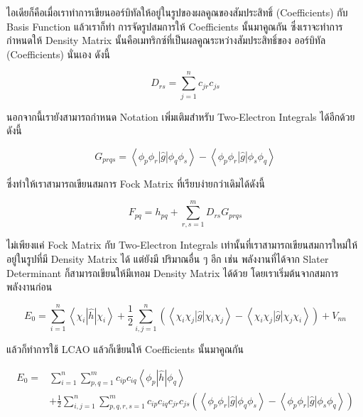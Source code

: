 \noindent ไอเดียก็คือเมื่อเราทำการเขียนออร์บิทัลให้อยู่ในรูปของผลคูณของสัมประสิทธิ์ (Coefficients) กับ Basis Function แล้วเราก็ทำ%
การจัดรูปสมการให้ Coefficients นั้นมาคูณกัน ซึ่งเราจะทำการกำหนดให้ Density Matrix นั้นคือเมทริกซ์ที่เป็นผลคูณระหว่างสัมประสิทธิ์ของ%
ออร์บิทัล (Coefficients) นั่นเอง ดังนี้

\begin{equation}
  \label{eq:Density Matrix}
  D_{r s} = \sum_{j=1}^n c_{j r} c_{j s}
\end{equation}

นอกจากนี้เรายังสามารถกำหนด Notation เพิ่มเติมสำหรับ Two-Electron Integrals ได้อีกด้วย ดังนี้

\begin{equation}
  \label{eq:two_electron_integral}
  G_{p r q s}
  =
  \left\langle\phi_p \phi_r|\hat{g}| \phi_q \phi_s\right\rangle
  - \left\langle\phi_p \phi_r|\hat{g}| \phi_s \phi_q\right\rangle
\end{equation}

\noindent ซึ่งทำให้เราสามารถเขียนสมการ Fock Matrix ที่เรียบง่ายกว่าเดิมได้ดังนี้

\begin{equation}
  \label{eq:Fock_Matrix}
  F_{p q}
  =
  h_{p q}+\sum_{r, s=1}^m D_{r s} G_{p r q s}
\end{equation}

ไม่เพียงแค่ Fock Matrix กับ Two-Electron Integrals เท่านั้นที่เราสามารถเขียนสมการใหม่ให้อยู่ในรูปที่มี Density Matrix ได้ แต่ยังมี%
ปริมาณอื่น ๆ อีก เช่น พลังงานที่ได้จาก Slater Determinant ก็สามารถเขียนให้มีเทอม Density Matrix ได้ด้วย โดยเราเริ่มต้นจากสมการ%
พลังงานก่อน

\begin{equation}
  E_0
  =
  \sum_{i=1}^n \left\langle\chi_i|\hat{h}| \chi_i\right\rangle
  + \frac{1}{2}
  \sum_{i, j=1}^n \left(\left\langle\chi_i \chi_j|\hat{g}| \chi_i \chi_j\right\rangle \right.
  - \left. \left\langle\chi_i \chi_j|\hat{g}| \chi_j \chi_i\right\rangle\right)+V_{n n}
\end{equation}

\noindent แล้วก็ทำการใช้ LCAO แล้วก็เขียนให้ Coefficients นั้นมาคูณกัน

\begin{equation}
  \begin{aligned}
    E_0
    =
     & \sum_{i=1}^n \sum_{p, q=1}^m c_{i p} c_{i q}\left\langle\phi_p|\hat{h}| \phi_q\right\rangle \\
     & + \frac{1}{2}
    \sum_{i, j=1}^n
    \sum_{p, q, r, s=1}^m
    c_{i p} c_{i q} c_{j r} c_{j s}
    \left(
    \left\langle\phi_p \phi_r|\hat{g}| \phi_q \phi_s\right\rangle
    - \left\langle\phi_p \phi_r|\hat{g}| \phi_s \phi_q\right\rangle
    \right)
  \end{aligned}
\end{equation}

